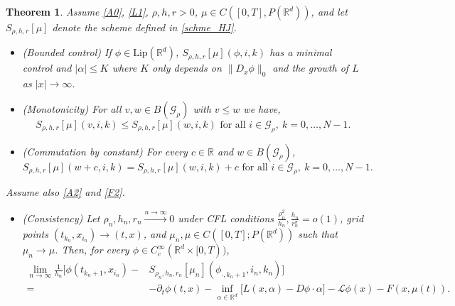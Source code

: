 \documentclass[a4paper,  twoside, 10pt, leqno]{amsart}
\newcommand{\R}{\mathbb{R}}
\newcommand{\rd}{\mathbb{R}^d}
\newtheorem{thm}{Theorem}[section]
\theoremstyle{remark}
\theoremstyle{definition}
\begin{document}
\begin{thm}\label{thm:schm_prop}
    Assume \ref{A0}, \ref{L1}, $\rho,h,r >0$, $\mu \in  C ( [0,T], P ( \rd ))$, and let $S_{\rho,h,r} [ \mu ]$ denote the scheme defined in \eqref{schme_HJ}.
        \begin{itemize} 

            \item[(i)] (Bounded control) If
                $\phi \in \text{Lip} ( \mathbb{R}^d )$, $S_{\rho,h,r} [ \mu ] ( \phi,i,k )$ 
                 has a minimal control and $|\alpha| \leq K$ 
                where $K$ only depends on  $\| D_{x} \phi  \|_{0} $ and 
                the growth of $L$ as $|x| \rightarrow \infty$. \medskip
       \item[(ii)] (Monotonicity) For all $v,w \in B ( \mathcal{G}_{\rho} ) $ with $v\leq w$ we have,
            \[
                S_{\rho,h,r} [\mu] (v,i,k) \leq S_{\rho,h,r} [\mu] (w,i,k) \text{ for all } i\in\mathcal{G}_{\rho}, \ k= 0,\ldots, N-1.
            \]
        \item[(iii)] (Commutation by constant) For every $c\in \R$ and $w \in B (\mathcal{G}_{\rho} )$,
            \[
                S_{\rho,h,r} [\mu] (w+c,i,k) = S_{\rho,h,r} [\mu] (w,i,k) +c \text{ for all } i\in\mathcal{G}_{\rho}, \ k= 0,\ldots, N-1.
            \]
        \end{itemize}
Assume also \ref{A2} and \ref{F2}.
        \begin{itemize}
        \item[(iv)] (Consistency) Let $\rho_{n},h_{n}, r_{n} \xrightarrow{n \to \infty} 0$ under CFL conditions $\frac{\rho_{n}^{2}}{h_{n}},\frac{h_{n}}{ r_{n}^{\sigma}} = o ( 1 )$, 
            grid points $(t_{k_{n}}, x_{i_{n}}) \to (t,x)$, and  
            $\mu_{n},\mu \in C ( [0,T]; P (\R^d))$ such that 
            $\mu_{n} \to \mu$.  
            Then, for every $\phi \in C_{c}^{\infty} (\R^d \times [0,T))$,  
            \begin{align*}
                \lim_{n \to \infty }\frac{1}{h_{n}} \big[ \phi ( t_{k_{n}+1}, x_{i_{n}}) - & S_{ \rho_{n}, h_{n}, r_n} [ \mu_{n} ] ( \phi_{\cdot,k_{n}+1}, i_{n}, k_{n} ) \big] \\
            = &  - \partial_{t} \phi ( t,x ) - \inf_{\alpha \in \mathbb{R}^d } \big[  L ( x, \alpha ) - D \phi \cdot \alpha  \big]  - \mathcal{L} \phi ( x )  - F ( x, \mu ( t )  ).
            \end{align*}
    \end{itemize}
\end{thm}
\end{document}
